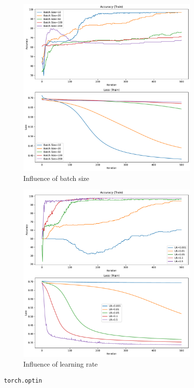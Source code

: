 \begin{figure}[H]\ContinuedFloat
    \centering
    \begin{subfigure}{0.45\textwidth}
        \centering
        \includegraphics[width=\textwidth]{figs/NN/torchoptim_batchsize.pdf}
        \caption{Influence of batch size}
        \label{subfig:torchoptim_batchsize}
    \end{subfigure}
    \begin{subfigure}{0.45\textwidth}
        \centering
        \includegraphics[width=\textwidth]{figs/NN/torchoptim_lr.pdf}
        \caption{Influence of learning rate}
        \label{subfig:torchoptim_lr}
    \end{subfigure}
    \caption{\texttt{torch.optin} }
    \label{fig:torchoptim}
\end{figure}

